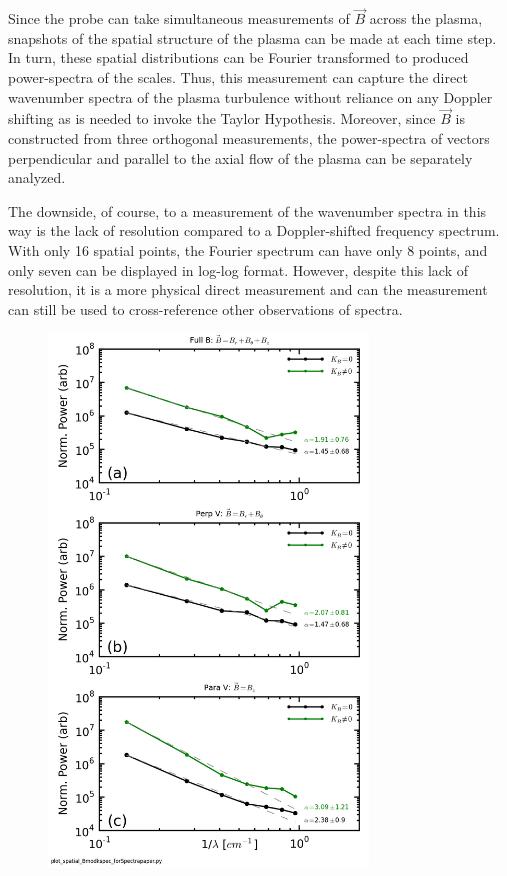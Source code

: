 \documentclass[aip,prl,amsmath,amssymb,reprint,superscriptaddress]{revtex4-1} %
\begin{document}
Since the probe can take simultaneous measurements of $\vec{B}$ across the plasma, snapshots of the spatial structure of the plasma can be made at each time step. In turn, these spatial distributions can be Fourier transformed to produced power-spectra of the scales. Thus, this measurement can capture the direct wavenumber spectra of the plasma turbulence without reliance on any Doppler shifting as is needed to invoke the Taylor Hypothesis. Moreover, since $\vec{B}$ is constructed from three orthogonal measurements, the power-spectra of vectors perpendicular and parallel to the axial flow of the plasma can be separately analyzed. 

The downside, of course, to a measurement of the wavenumber spectra in this way is the lack of resolution compared to a Doppler-shifted frequency spectrum. With only 16 spatial points, the Fourier spectrum can have only 8 points, and only seven can be displayed in log-log format. However, despite this lack of resolution, it is a more physical direct measurement and can the measurement can still be used to cross-reference other observations of spectra.

\begin{figure}[!htbp]
\centerline{
\includegraphics[width=8.5cm]{Bmod_FFTwavenumberspectra_wFits_40t60us}}
\caption{\label{fig:wavenumber_spectra}}
\end{figure}
\end{document}

